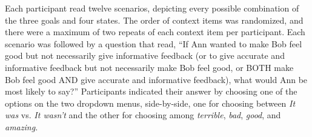 \documentclass[oneside]{report}
\begin{document}
Each participant read twelve scenarios, depicting every possible
combination of the three goals and four states. The order of context
items was randomized, and there were a maximum of two repeats of each
context item per participant. Each scenario was followed by a question
that read, ``If Ann wanted to make Bob feel good but not necessarily
give informative feedback (or to give accurate and informative feedback
but not necessarily make Bob feel good, or BOTH make Bob feel good AND
give accurate and informative feedback), what would Ann be most likely
to say?'' Participants indicated their answer by choosing one of the
options on the two dropdown menus, side-by-side, one for choosing
between \emph{It was} vs. \emph{It wasn't} and the other for choosing
among \emph{terrible}, \emph{bad}, \emph{good}, and \emph{amazing.}
\end{document}

